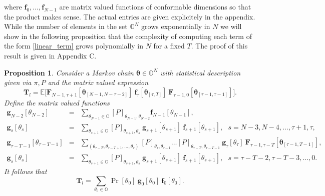 \documentclass[letterpaper,11pt]{article}
\newtheorem{proposition}[theorem]{Proposition}
\begin{document}
where $\mathbf{f}_0, \hdots, \mathbf{f}_{N-1}$ are matrix valued functions of conformable dimensions 
so that the product makes sense. The actual entries are given explicitely in the appendix. 
While the number of elements in the set $ \mathbb{O}^N$ grows exponentially in $N$ 
we will show in the following proposition that the complexity of computing each term of the form \eqref{linear_term}
grows polynomially in $N$ for a fixed $T$.  The proof of this result is given in Appendix C.


\begin{proposition} \label{lemma1}
	Consider a Markov chain $ \bm{\theta} \in \mathbb{O}^N$ with statistical description given via
	$ \pi, P$ 
	and the matrix valued expression 
	\begin{equation}
	\label{typical_linear_term}
	\mathbf{T}_l  = \mathbb{E}\bigg[\mathbf{F}_{N-1, \tau+1}[\bm{\theta}_{[N-1,N-\tau-2]}] ~ \mathbf{f}_{\tau}[\bm{\theta}_{[\tau,T]}] ~ 
	\mathbf{F}_{\tau-1, 0}[\bm{\theta}_{[\tau-1,\tau-1]}]\bigg].
	\end{equation}
	Define the matrix valued functions 
	\begin{eqnarray}
	\label{recursive_linear_1}
	\mathbf{g}_{N-2}[\theta_{N-2}] & = & \sum_{\theta_{N-1} \in \mathbb{O}} 
	[P]_{\theta_{N-1}, \theta_{N-2}} \mathbf{f}_{N-1}[\theta_{N-1}],  \\
	\label{recursive_linear_2}
	\mathbf{g}_{s}[\theta_{s}] & = & \sum_{\theta_{s+1} \in \mathbb{O}} 
	[P]_{\theta_{s+1}, \theta_{s}} ~  \mathbf{g}_{s+1}[\theta_{s+1}]~ \mathbf{f}_{s+1}[\theta_{s+1}], ~~~
	s = N-3, N-4, \hdots, \tau+1, \tau,  \\
	\label{recursive_linear_3}
	\mathbf{g}_{\tau-T-1}[\theta_{\tau-T-1}] & = &
	\sum_{(\theta_{\tau-T},\theta_{\tau-T+1}, \hdots, \theta_{\tau} )} 
	[P]_{\theta_{\tau}, \theta_{\tau-1}} \hdots [P]_{\theta_{\tau-T}, \theta_{\tau-T-1}}
	~\mathbf{g}_{\tau}[\theta_{\tau}] ~ 
	\mathbf{F}_{\tau-1, \tau-T}[\bm{\theta}_{[\tau-1,T-1]}], \\
	\label{recursive_linear_4}
	\mathbf{g}_{s}[\theta_{s}] & = & \sum_{\theta_{s+1} \in \mathbb{O}} 
	[P]_{\theta_{s+1}, \theta_{s}} ~  \mathbf{g}_{s+1}[\theta_{s+1}]~ \mathbf{f}_{s+1}[\theta_{s+1}], ~~~
	s = \tau - T -2 ,  \tau - T - 3, \hdots, 0.  
	\end{eqnarray}
	It follows that 
	$$
	\mathbf{T}_l = \sum_{\theta_0 \in \mathbb{O}}	\Pr[ \theta_0 ] ~ \mathbf{g}_0[\theta_0] ~\mathbf{f}_0[\theta_0].
	$$
\end{proposition}

\vspace{0.1in}
\end{document}
